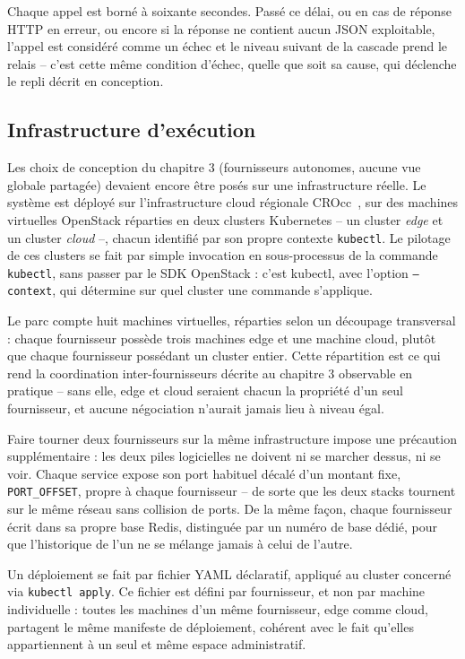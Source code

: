 Chaque appel est borné à soixante secondes. Passé ce délai, ou en cas de réponse HTTP en erreur, ou encore si la réponse ne contient aucun JSON exploitable, l'appel est considéré comme un échec et le niveau suivant de la cascade prend le relais -- c'est cette même condition d'échec, quelle que soit sa cause, qui déclenche le repli décrit en conception.

\subsection{Infrastructure d'exécution}

Les choix de conception du chapitre 3 (fournisseurs autonomes, aucune vue globale partagée) devaient encore être posés sur une infrastructure réelle. Le système est déployé sur l'infrastructure cloud régionale CROcc~\cite{crocc_website}, sur des machines virtuelles OpenStack réparties en deux clusters Kubernetes -- un cluster \emph{edge} et un cluster \emph{cloud} --, chacun identifié par son propre contexte \texttt{kubectl}. Le pilotage de ces clusters se fait par simple invocation en sous-processus de la commande \texttt{kubectl}, sans passer par le SDK OpenStack : c'est kubectl, avec l'option \texttt{--context}, qui détermine sur quel cluster une commande s'applique.

Le parc compte huit machines virtuelles, réparties selon un découpage transversal : chaque fournisseur possède trois machines edge et une machine cloud, plutôt que chaque fournisseur possédant un cluster entier. Cette répartition est ce qui rend la coordination inter-fournisseurs décrite au chapitre 3 observable en pratique -- sans elle, edge et cloud seraient chacun la propriété d'un seul fournisseur, et aucune négociation n'aurait jamais lieu à niveau égal.

Faire tourner deux fournisseurs sur la même infrastructure impose une précaution supplémentaire : les deux piles logicielles ne doivent ni se marcher dessus, ni se voir. Chaque service expose son port habituel décalé d'un montant fixe, \texttt{PORT\_OFFSET}, propre à chaque fournisseur -- de sorte que les deux stacks tournent sur le même réseau sans collision de ports. De la même façon, chaque fournisseur écrit dans sa propre base Redis, distinguée par un numéro de base dédié, pour que l'historique de l'un ne se mélange jamais à celui de l'autre.

Un déploiement se fait par fichier YAML déclaratif, appliqué au cluster concerné via \texttt{kubectl apply}. Ce fichier est défini par fournisseur, et non par machine individuelle : toutes les machines d'un même fournisseur, edge comme cloud, partagent le même manifeste de déploiement, cohérent avec le fait qu'elles appartiennent à un seul et même espace administratif. 
